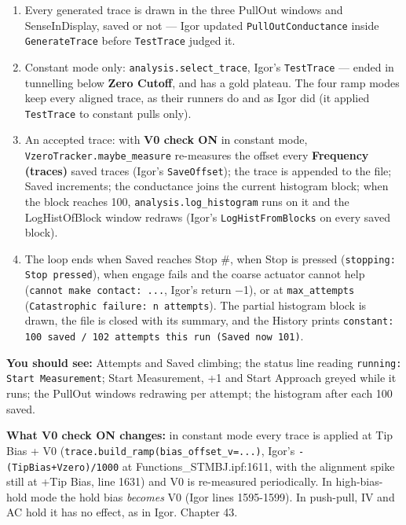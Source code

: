 \begin{enumerate}[leftmargin=*]
\item Every generated trace is drawn in the three PullOut windows and SenseInDisplay, saved or not --- Igor updated \texttt{Pull\discretionary{}{}{}Out\discretionary{}{}{}Conductance} inside \texttt{Generate\discretionary{}{}{}Trace} before \texttt{Test\discretionary{}{}{}Trace} judged it.
\item Constant mode only: \texttt{analysis.\discretionary{}{}{}select\_\discretionary{}{}{}trace}, Igor's \texttt{Test\discretionary{}{}{}Trace} --- ended in tunnelling below \textbf{Zero Cutoff}, and has a gold plateau. The four ramp modes keep every aligned trace, as their runners do and as Igor did (it applied \texttt{Test\discretionary{}{}{}Trace} to constant pulls only).
\item An accepted trace: with \textbf{V0 check ON} in constant mode, \texttt{Vzero\discretionary{}{}{}Tracker.\discretionary{}{}{}maybe\_\discretionary{}{}{}measure} re-measures the offset every \textbf{Frequency (traces)} saved traces (Igor's \texttt{Save\discretionary{}{}{}Offset}); the trace is appended to the file; Saved increments; the conductance joins the current histogram block; when the block reaches 100, \texttt{analysis.\discretionary{}{}{}log\_\discretionary{}{}{}histogram} runs on it and the LogHistOfBlock window redraws (Igor's \texttt{Log\discretionary{}{}{}Hist\discretionary{}{}{}From\discretionary{}{}{}Blocks} on every saved block).
\item The loop ends when Saved reaches Stop \#, when Stop is pressed (\texttt{stopping: Stop pressed}), when engage fails and the coarse actuator cannot help (\texttt{cannot make contact: .\discretionary{}{}{}.\discretionary{}{}{}.\discretionary{}{}{}}, Igor's return −1), or at \texttt{max\_\discretionary{}{}{}attempts} (\texttt{Catastrophic failure: n attempts}). The partial histogram block is drawn, the file is closed with its summary, and the History prints \texttt{constant: 100 saved /\discretionary{}{}{} 102 attempts this run (Saved now 101)}.
\end{enumerate}

\textbf{You should see:} Attempts and Saved climbing; the status line reading \texttt{running: Start Measurement}; Start Measurement, +1 and Start Approach greyed while it runs; the PullOut windows redrawing per attempt; the histogram after each 100 saved.

\textbf{What V0 check ON changes:} in constant mode every trace is applied at Tip Bias + V0 (\texttt{trace.\discretionary{}{}{}build\_\discretionary{}{}{}ramp(bias\_\discretionary{}{}{}offset\_\discretionary{}{}{}v=.\discretionary{}{}{}.\discretionary{}{}{}.\discretionary{}{}{})}, Igor's \texttt{-(Tip\discretionary{}{}{}Bias+Vzero)/\discretionary{}{}{}1000} at Functions\_STMBJ.ipf:1611, with the alignment spike still at +Tip Bias, line 1631) and V0 is re-measured periodically. In high-bias-hold mode the hold bias \emph{becomes} V0 (Igor lines 1595-1599). In push-pull, IV and AC hold it has no effect, as in Igor. Chapter 43.


